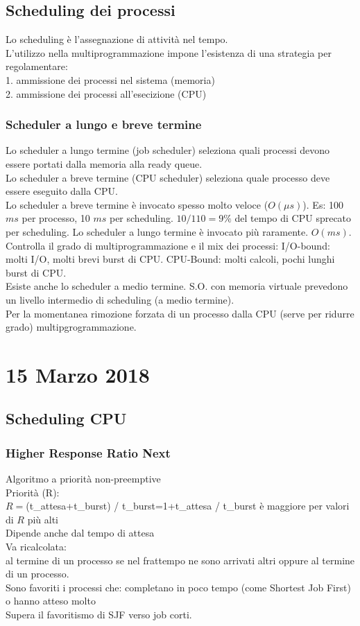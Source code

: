 \documentclass{article}
\begin{document}
\subsection*{Scheduling dei processi}
Lo scheduling \`{e} l'assegnazione di attivit\`{a} nel tempo.\\
L'utilizzo nella multiprogrammazione impone l'esistenza di una strategia per regolamentare:\\
1. ammissione dei processi nel sistema (memoria)\\
2. ammissione dei processi all'esecizione (CPU)
\subsubsection*{Scheduler a lungo e breve termine}
Lo scheduler a lungo termine (job scheduler) seleziona quali
processi devono essere portati dalla memoria alla ready queue.\\
Lo scheduler a breve termine (CPU scheduler) seleziona quale processo
deve essere eseguito dalla CPU.\\
Lo scheduler a breve termine \`{e} invocato spesso molto veloce ($O(\mu s)$).
Es: 100 $ms$ per processo, 10 $ms$ per scheduling. $10/110=9\%$ del tempo
di CPU sprecato per scheduling.
Lo scheduler a lungo termine \`{e} invocato pi\`{u} raramente.
$O(ms)$. Controlla il grado di multiprogrammazione e il mix
dei processi: I/O-bound: molti I/O, molti brevi burst di CPU.
CPU-Bound: molti calcoli, pochi lunghi burst di CPU.\\
Esiste anche lo scheduler a medio termine. S.O. con memoria virtuale prevedono un livello
intermedio di scheduling (a medio termine).\\
Per la momentanea rimozione forzata di un processo dalla CPU (serve per ridurre grado)
multipgrogrammazione.
\section*{15 Marzo 2018}
\subsection*{Scheduling CPU}
\subsubsection*{Higher Response Ratio Next}
Algoritmo a priorit\`{a} non-preemptive\\
Priorit\`{a} (R):\\
$R=$(t\_attesa+t\_burst) / t\_burst=1+t\_attesa / t\_burst \`{e} maggiore per valori di $R$ pi\`{u} alti\\
Dipende anche dal tempo di attesa\\
Va ricalcolata:\\
al termine di un processo se nel frattempo ne sono arrivati altri oppure
al termine di un processo.\\
Sono favoriti i processi che: completano in poco tempo (come Shortest Job First) o hanno atteso molto\\
Supera il favoritismo di SJF verso job corti.\\
\end{document}
